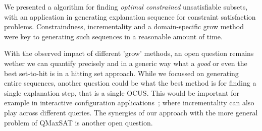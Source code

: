 We presented a \hitsetbased algorithm for finding \textit{optimal constrained} unsatisfiable subsets, with an application in generating explanation sequence for constraint satisfaction problems. Constraindness, incrementality and a domain-specific grow method were key to generating such sequences in a reasonable amount of time.




With the observed impact of different 'grow' methods, an open question remains wether we can quantify precisely and in a generic way what a \textit{good} or even the best set-to-hit is in a hitting set approach. 
While we focussed on generating entire sequences, another question could be what the best method is for finding a single explanation step, that is a single OCUS. 
This would be important for example in interactive configuration applications~\cite{van2017kb}; where incrementality can also play across different queries.
The synergies of our approach with the more general problem of QMaxSAT \cite{DBLP:journals/constraints/IgnatievJM16} is another open question.


